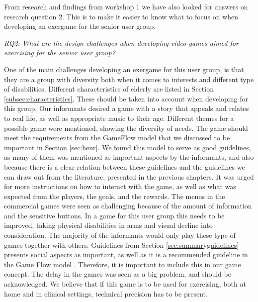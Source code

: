 From research and findings from workshop 1 we have also looked for answers on research question 2. This is to make it easier to know what to focus on when developing an exergame for the senior user group.

\emph{RQ2: What are the design challenges when developing video games aimed for exercising for the senior user group?}

One of the main challenges developing an exergame for this user group, is that they are a group with diversity both when it comes to interests and different type of disabilities. Different characteristics of elderly are listed in Section \ref{subsec:characteristics}. These should be taken into account when developing for this group. Our informants desired a game with a story that appeals and relates to real life, as well as appropriate music to their age. Different themes for a possible game were mentioned, showing the diversity of needs. The game should meet the requirements from the GameFlow model \cite{sweetser} that we discussed to be important in Section \ref{sec:heur}. We found this model to serve as good guidelines, as many of them was mentioned as important aspects by the informants, and also because there is a clear relation between these guidelines and the guidelines we can draw out from the literature, presented in the previous chapters. It was urged for more instructions on how to interact with the game, as well as what was expected from the players, the goals, and the rewards. The menus in the commercial games were seen as challenging because of the amount of information and the sensitive buttons. In a game for this user group this needs to be improved, taking physical disabilities in arms and visual decline into consideration. The majority of the informants would only play these type of games together with others. Guidelines from Section \ref{sec:summaryguidelines} presents social aspects as important, as well as it is a recommended guideline in the Game Flow model \cite{sweetser}. Therefore, it is important to include this in our game concept. The delay in the games was seen as a big problem, and should be acknowledged. We believe that if this game is to be used for exercising, both at home and in clinical settings, technical precision has to be present. 

